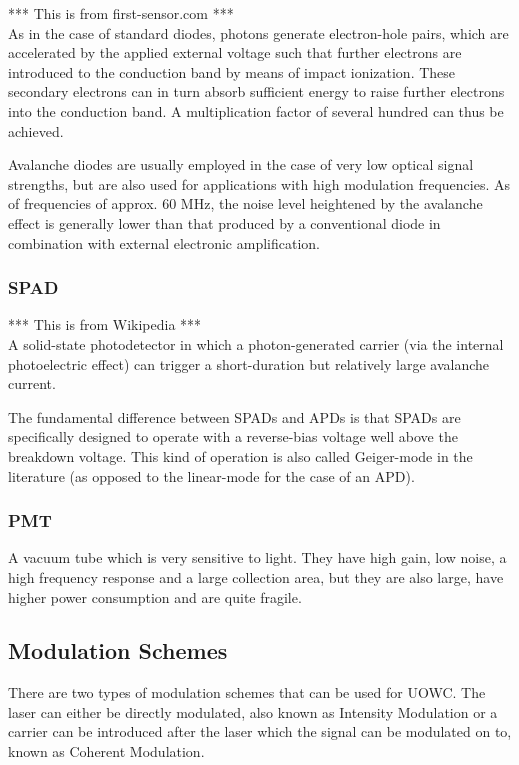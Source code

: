 \documentclass{article}
\begin{document}
*** This is from first-sensor.com *** \\
As in the case of standard diodes, photons generate electron-hole pairs,
which are accelerated by the applied external voltage such that further
electrons are introduced to the conduction band by means of impact ionization.
These secondary electrons can in turn absorb sufficient energy to raise further
electrons into the conduction band. A multiplication factor of several hundred
can thus be achieved.

Avalanche diodes are usually employed in the case of very low optical signal
strengths, but are also used for applications with high modulation frequencies.
As of frequencies of approx. 60 MHz, the noise level heightened by the
avalanche effect is generally lower than that produced by a conventional diode
in combination with external electronic amplification.

\subsubsection{\ac{SPAD}}
*** This is from Wikipedia ***\\
A solid-state photodetector in which a photon-generated carrier (via the
internal photoelectric effect) can trigger a short-duration but relatively
large avalanche current.

The fundamental difference between SPADs and APDs is that SPADs are
specifically designed to operate with a reverse-bias voltage well above the
breakdown voltage. This kind of operation is also called Geiger-mode in the
literature (as opposed to the linear-mode for the case of an APD).

\subsubsection{\ac{PMT}}
A vacuum tube which is very sensitive to light. They have high gain, low noise,
a high frequency response and a large collection area, but they are also large,
have higher power consumption and are quite fragile.

\subsection{Modulation Schemes}
There are two types of modulation schemes that can be used for \ac{UOWC}.
The laser can either be directly modulated, also known as Intensity Modulation
or a carrier can be introduced after the laser which the signal can be
modulated on to, known as Coherent Modulation.
 
\end{document}
